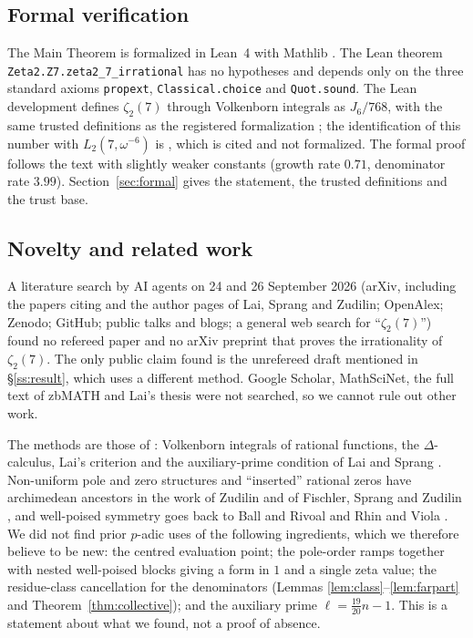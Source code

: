 \documentclass{amsart}
\theoremstyle{definition}
\theoremstyle{remark}
\numberwithin{equation}{section}
\begin{document}
\subsection{Formal verification}\label{ss:intro-formal}

The Main Theorem is formalized in Lean~4 \cite{MU21} with Mathlib
\cite{Mathlib20}. The Lean theorem \texttt{Zeta2.Z7.zeta2\_7\_irrational} has
no hypotheses and depends only on the three standard axioms
\texttt{propext}, \texttt{Classical.choice} and \texttt{Quot.sound}. The Lean
development defines $\zeta_2(7)$ through Volkenborn integrals as $J_6/768$,
with the same trusted definitions as the registered formalization
\cite{DevPair26,PalPair26}; the identification of this number with
$L_2(7,\omega^{-6})$ is \cite[Lemma~2.8]{LSZ26}, which is cited and not
formalized. The formal proof follows the text with slightly weaker constants
(growth rate $0.71$, denominator rate $3.99$). Section~\ref{sec:formal}
gives the statement, the trusted definitions and the trust base.

\subsection{Novelty and related work}\label{ss:novelty}

A literature search by AI agents on 24 and 26 September 2026 (arXiv, including
the papers citing \cite{Lai25} and the author pages of Lai, Sprang and
Zudilin; OpenAlex; Zenodo; GitHub; public talks and blogs; a general web
search for ``$\zeta_2(7)$'') found no refereed paper and no arXiv preprint that
proves the irrationality of $\zeta_2(7)$. The only public claim found is the
unrefereed draft \cite{Lon26a} mentioned in \S\ref{ss:result}, which uses a
different method. Google Scholar, MathSciNet, the full text of zbMATH and
Lai's thesis were not searched, so we cannot rule out other work.

The methods are those of \cite{Spr20,Lai25,LS25,LSZ26}: Volkenborn integrals
of rational functions, the $\Delta$-calculus, Lai's criterion and the
auxiliary-prime condition of Lai and Sprang \cite[Lemma~2.2]{LS25}.
Non-uniform pole and zero structures and ``inserted'' rational zeros have
archimedean ancestors in the work of Zudilin \cite{Zud04} and of Fischler,
Sprang and Zudilin \cite{FSZ19}, and well-poised symmetry goes back to Ball
and Rivoal \cite{BR01} and Rhin and Viola \cite{RV01}. We did not find prior
$p$-adic uses of the following ingredients, which we therefore believe to be
new: the centred evaluation point; the pole-order ramps together with nested
well-poised blocks giving a form in $1$ and a single zeta value; the
residue-class cancellation for the denominators (Lemmas
\ref{lem:class}--\ref{lem:farpart} and Theorem~\ref{thm:collective}); and the
auxiliary prime $\ell=\frac{19}{20}n-1$. This is a statement about what we
found, not a proof of absence.
\end{document}
